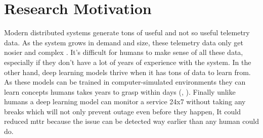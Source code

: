 \section{Research Motivation}

Modern distributed systems generate tons of useful and not so useful telemetry data. As the system grows in demand and size, these telemetry data only get nosier and complex \citep{Untangli35:online}. It's difficult for humans to make sense of all these data, especially if they don't have a lot of years of experience with the system. In the other hand, deep learning models thrive when it has tons of data to learn from. As these models can be trained in computer-simulated environments they can learn concepts humans takes years to grasp within days (\cite{OpenAI_dota}, \cite{silver2017mastering}). Finally unlike humans a deep learning model can monitor a service 24x7 without taking any breaks which will not only prevent outage even before they happen, It could reduced \ac{mttr} because the issue can be detected way earlier than any human could do. 

